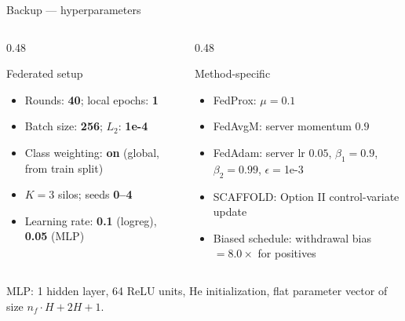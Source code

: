 \documentclass[aspectratio=169, 11pt]{beamer}
\begin{document}
\begin{frame}{Backup --- hyperparameters}
\begin{columns}[T]
\begin{column}{0.48\textwidth}
\begin{block}{Federated setup}
\begin{itemize}\small
\item Rounds: \textbf{40}; local epochs: \textbf{1}
\item Batch size: \textbf{256}; $L_2$: \textbf{1e-4}
\item Class weighting: \textbf{on} (global, from train split)
\item $K = 3$ silos; seeds \textbf{0--4}
\item Learning rate: \textbf{0.1} (logreg), \textbf{0.05} (MLP)
\end{itemize}
\end{block}
\end{column}
\begin{column}{0.48\textwidth}
\begin{block}{Method-specific}
\begin{itemize}\small
\item FedProx: $\mu = 0.1$
\item FedAvgM: server momentum $0.9$
\item FedAdam: server lr $0.05$, $\beta_1{=}0.9$, $\beta_2{=}0.99$,
      $\epsilon{=}$1e-3
\item SCAFFOLD: Option II control-variate update
\item Biased schedule: withdrawal bias $= 8.0\times$ for positives
\end{itemize}
\end{block}
\end{column}
\end{columns}
\vspace{0.4em}
{\footnotesize MLP: 1 hidden layer, 64 ReLU units, He initialization,
flat parameter vector of size $n_f \cdot H + 2H + 1$.}
\end{frame}
\end{document}
